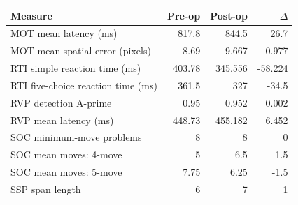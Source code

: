 \begin{tabular}{lrrr}
\toprule
Measure & Pre-op & Post-op & $\Delta$ \\
\midrule
MOT mean latency (ms) & 817.8 & 844.5 & 26.7 \\
MOT mean spatial error (pixels) & 8.69 & 9.667 & 0.977 \\
RTI simple reaction time (ms) & 403.78 & 345.556 & -58.224 \\
RTI five-choice reaction time (ms) & 361.5 & 327 & -34.5 \\
RVP detection A-prime & 0.95 & 0.952 & 0.002 \\
RVP mean latency (ms) & 448.73 & 455.182 & 6.452 \\
SOC minimum-move problems & 8 & 8 & 0 \\
SOC mean moves: 4-move & 5 & 6.5 & 1.5 \\
SOC mean moves: 5-move & 7.75 & 6.25 & -1.5 \\
SSP span length & 6 & 7 & 1 \\
\bottomrule
\end{tabular}

